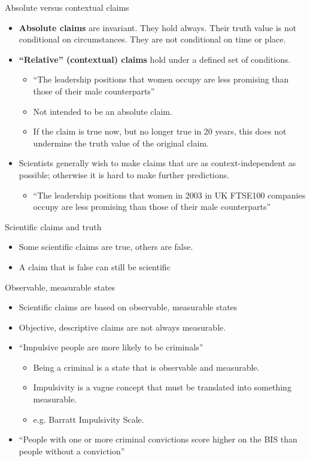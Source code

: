 \documentclass{beamer}
\begin{document}
\begin{frame}{Absolute versus contextual claims}
	\begin{itemize}	
		\item 	\textbf{Absolute claims} are invariant. They hold always. Their truth value is not conditional on circumstances. They are not conditional on time or place.
		\item \textbf{``Relative'' (contextual) claims} hold under a defined set of conditions.
		\begin{itemize}
			\item ``The leadership positions that women occupy are less promising than those of their male counterparts''
			\item Not intended to be an absolute claim.
			\item If the claim is true now, but no longer true in 20 years, this does not undermine the truth value of the original claim.
		\end{itemize}
		\item Scientists generally wish to make claims that are as context-independent as possible; otherwise it is hard to make further predictions.
		\begin{itemize}
			\item ``The leadership positions that women in 2003 in UK FTSE100 companies occupy are less promising than those of their male counterparts''
		\end{itemize}
	\end{itemize}
\end{frame}



\begin{frame}{Scientific claims and truth}
	\begin{itemize}
		\item Some scientific claims are true, others are false.
		\item A claim that is false can still be scientific
	\end{itemize}
\end{frame}

\begin{frame}{Observable, measurable states}
	\begin{itemize}
		\item Scientific claims are based on observable, measurable states
		\item Objective, descriptive claims are not always measurable.
		\item ``Impulsive people are more likely to be criminals''
		\begin{itemize}
			\item Being a criminal is a state that is observable and measurable.
			\item Impulsivity is a vague concept that must be translated into something measurable.
			\item e.g. Barratt Impulsivity Scale.
		\end{itemize}
		\item ``People with one or more criminal convictions score higher on the BIS than people without a conviction''
	\end{itemize}
\end{frame}
\end{document}
